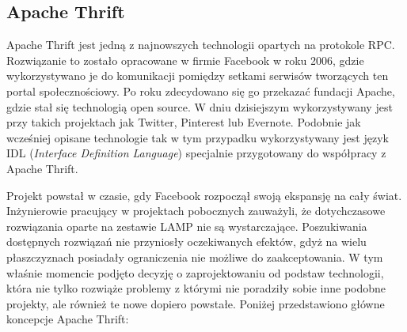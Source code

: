 \subsection{Apache Thrift}
Apache Thrift jest jedną z najnowszych technologii opartych na protokole RPC\@. Rozwiązanie to zostało opracowane w firmie Facebook w roku 2006, gdzie wykorzystywano je do komunikacji pomiędzy setkami serwisów tworzących ten portal społecznościowy. Po roku zdecydowano się go przekazać fundacji Apache, gdzie stał się technologią open source. W dniu dzisiejszym wykorzystywany jest przy takich projektach jak Twitter, Pinterest lub Evernote. Podobnie jak wcześniej opisane technologie tak w tym przypadku wykorzystywany jest język IDL (\textit{Interface Definition Language}) specjalnie przygotowany do współpracy z Apache Thrift. \par Projekt powstał w czasie, gdy Facebook rozpoczął swoją ekspansję na cały świat. Inżynierowie pracujący w projektach pobocznych zauważyli, że dotychczasowe rozwiązania oparte na zestawie LAMP nie są wystarczające\cite{slee2007thrift}. Poszukiwania dostępnych rozwiązań nie przyniosły oczekiwanych efektów, gdyż na wielu płaszczyznach posiadały ograniczenia nie możliwe do zaakceptowania. W tym właśnie momencie podjęto decyzję o zaprojektowaniu od podstaw technologii, która nie tylko rozwiąże problemy z którymi nie poradziły sobie inne podobne projekty, ale również te nowe dopiero powstałe. Poniżej przedstawiono główne koncepcje Apache Thrift\cite{rakowski2015learning}:
